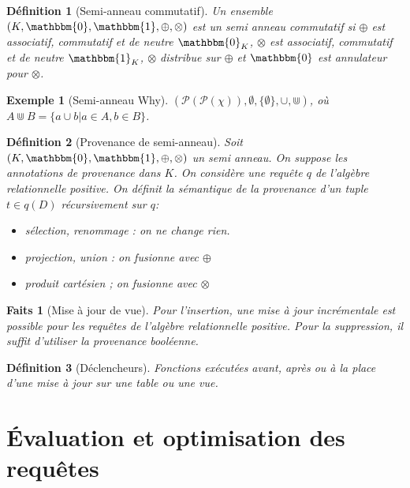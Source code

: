 \documentclass[landscape]{article}
\renewcommand{\P}{\mathscr{P}}
\newcommand{\1}{\mathbbm{1}}
\newcommand{\0}{\mathbbm{0}}
\newtheorem{defi}{Définition}
\newtheorem{fact}{Faits}
\newtheorem{ex}{Exemple}
\begin{document}
\begin{multicols}{2}
    \begin{defi}[Semi-anneau commutatif] Un ensemble $(K, \0, \1, \oplus, \otimes)$
        est un semi anneau commutatif si $\oplus$ est associatif, commutatif et
        de neutre $\0_K$, $\otimes$ est associatif, commutatif et de neutre
        $\1_K$, $\otimes$ distribue sur $\oplus$ et $\0$ est annulateur pour
        $\otimes$.
    \end{defi}

    \begin{ex}[Semi-anneau Why]
        $(\P(\P(\chi)), \emptyset, \{\emptyset\}, \cup, \Cup)$, où
        $A\Cup B = \{a\cup b | a\in A, b\in B\}$.
    \end{ex}

    \begin{defi}[Provenance de semi-anneau]
        Soit $(K, \0, \1, \oplus, \otimes)$ un semi anneau. On suppose les annotations
        de provenance dans $K$. On considère une requête $q$ de l'algèbre relationnelle
        positive. On définit la sémantique de la provenance d'un tuple $t\in q(D)$
        récursivement sur $q$: \begin{itemize}
            \item sélection, renommage : on ne change rien.
            \item projection, union : on fusionne avec $\oplus$
            \item produit cartésien ; on fusionne avec $\otimes$
        \end{itemize}
    \end{defi}

    \begin{fact}[Mise à jour de vue] Pour l'insertion, une mise à jour incrémentale
        est possible pour les requêtes de l'algèbre relationnelle positive. Pour
        la suppression, il suffit d'utiliser la provenance booléenne.
    \end{fact}
    
    \begin{defi}[Déclencheurs]
        Fonctions exécutées avant, après ou à la place d'une mise à jour sur une
        table ou une vue.
    \end{defi}

    \section{Évaluation et optimisation des requêtes}

\end{multicols}
\end{document}
